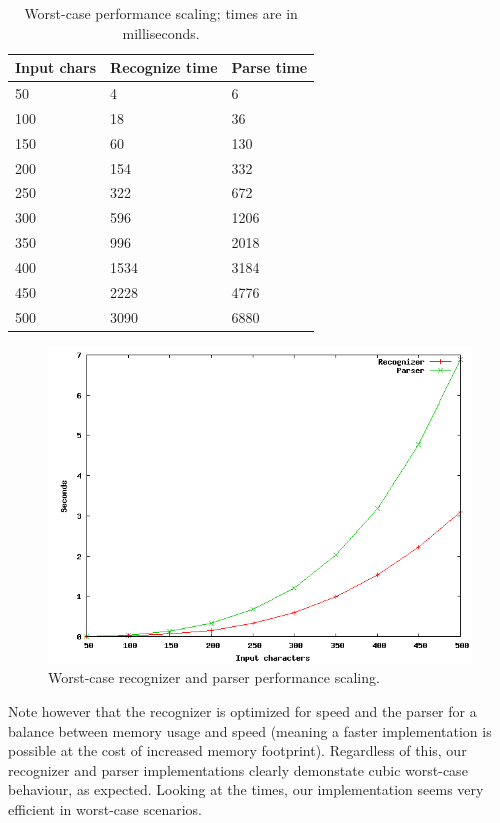 \documentclass[a4paper,10pt]{article}
\begin{document}
\begin{table}[H]
\centering
\begin{tabular}{ | p{5em} | p{7em} | p{6em} | }
  \hline
  Input chars & Recognize time & Parse time \\
  \hline
  50 & 4 & 6 \\
  100 & 18 & 36 \\
  150 & 60 & 130 \\
  200 & 154 & 332 \\
  250 & 322 & 672 \\
  300 & 596 & 1206 \\
  350 & 996 & 2018 \\
  400 & 1534 & 3184 \\
  450 & 2228 & 4776 \\
  500 & 3090 & 6880 \\
  \hline
\end{tabular}
\caption{Worst-case performance scaling; times are in milliseconds.}
\end{table}

\begin{figure}[H]
\centering
\includegraphics[scale=0.5]{worst-case.png}
\caption{Worst-case recognizer and parser performance scaling.}
\end{figure}

Note however that the recognizer is optimized for speed and the parser for a balance between memory usage and speed (meaning a faster implementation is possible at the cost of increased memory footprint). Regardless of this, our recognizer and parser implementations clearly demonstate cubic worst-case behaviour, as expected. Looking at the times, our implementation seems very efficient in worst-case scenarios.
\end{document}
